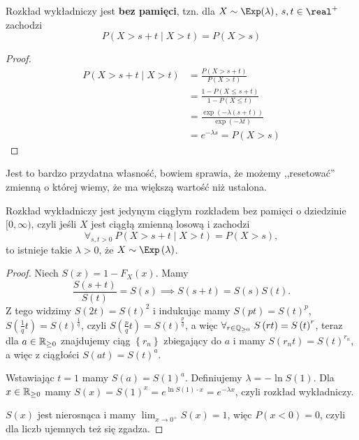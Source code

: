 \begin{theorem}[Lemat 8.4 P\&C]
	Rozkład wykładniczy jest \textbf{bez pamięci}, tzn. dla \(X \sim \Exp(\lambda)\), \(s, t \in \real^+\) zachodzi
	\[
		P(X > s + t \mid X > t) = P(X > s)
	\]
\end{theorem}
\begin{proof}
	\begin{align*}
		P(X > s + t \mid X > t) & = \frac{P(X > s + t)}{P(X > t)}                  \\
		                        & = \frac{1 - P(X \leq s + t)}{1 - P(X \leq t)}    \\
		                        & = \frac{\exp(-\lambda(s + t))}{\exp(-\lambda t)} \\
		                        & = e^{-\lambda s} = P(X > s)
	\end{align*}
\end{proof}

Jest to bardzo przydatna własność, bowiem sprawia, że możemy ,,resetować'' zmienną o której wiemy, że ma większą wartość niż ustalona.

\begin{theorem}
	Rozkład wykładniczy jest jedynym ciągłym rozkładem bez pamięci o dziedzinie \([0, \infty)\), czyli jeśli \(X\) jest ciągłą zmienną losową i zachodzi
	\[ \forall_{s,t>0} \ P\left( X> s+t \mid X>t \right) = P\left( X >s \right) ,  \]
	to istnieje takie \(\lambda > 0\), że \(X \sim \Exp\left( \lambda \right) \).
\end{theorem}
\begin{proof}
	Niech \(S\left( x  \right) = 1 - F_X\left( x  \right) \). Mamy
	\[ \frac{S\left( s+t \right) }{S\left( t \right) } = S\left( s  \right) \implies  S\left( s+t \right) = S\left( s  \right) S\left( t  \right) . \]
	Z tego widzimy \(S \left( 2t \right) = S\left( t \right)^2 \) i indukując mamy \(S\left( p t  \right) = S\left( t  \right) ^{p}\), \( S\left( \frac{1}{q}t \right) = S\left( t  \right) ^{\frac{1}{q}} \), czyli \(S\left( \frac{p}{q}t \right) = S\left( t  \right) ^{\frac{p}{q}}\), a więc \(\forall_{r \in \mathbb{Q}_{\ge 0}} \ S\left( rt \right) = S\left( t  \right) ^{r} \), teraz dla \(a\in \mathbb{R}_{\ge 0}\) znajdujemy ciąg \(\left\{ r_n \right\} \) zbiegający do \(a\) i mamy \(S\left( r_n t  \right) = S\left( t  \right) ^{r_n}\), a więc z ciągłości \(S\left( at  \right) = S\left( t  \right) ^{a}\).

	Wstawiając \(t=1\) mamy \(S\left( a  \right) = S\left( 1 \right) ^{a}\). Definiujemy \(\lambda = -\ln S\left( 1 \right) \). Dla \(x \in \mathbb{R}_{\ge 0}\) mamy \(S\left( x  \right) = S\left( 1 \right) ^{x} = e^{\ln S\left( 1 \right) \cdot  x } = e^{-\lambda x}\), czyli rozkład wykładniczy.

	\(S\left( x  \right) \) jest nierosnąca i mamy \( \lim_{x \to 0^{+}} S\left( x  \right) = 1\), więc \(P\left( x < 0 \right) = 0\), czyli dla liczb ujemnych też się zgadza.
\end{proof}

